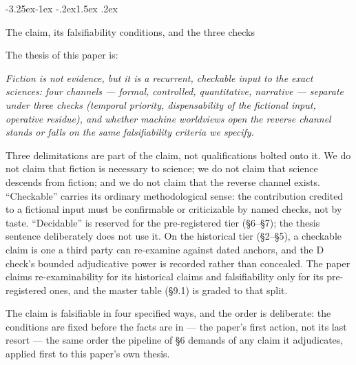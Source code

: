 \documentclass[11pt,a4paper]{article}
\makeatletter
\renewcommand\subsection{\@startsection{subsection}{2}{\z@}%
  {-3.25ex\@plus -1ex \@minus -.2ex}{1.5ex \@plus .2ex}%
  {\normalfont\large\bfseries\raggedright}}
\makeatother
\begin{document}
\subsection{The claim, its falsifiability conditions, and the three checks}

The thesis of this paper is:

\textit{Fiction is not evidence, but it is a recurrent, checkable input to the exact sciences: four channels — formal, controlled, quantitative, narrative — separate under three checks (temporal priority, dispensability of the fictional input, operative residue), and whether machine worldviews open the reverse channel stands or falls on the same falsifiability criteria we specify.}

Three delimitations are part of the claim, not qualifications bolted onto it. We do not claim that fiction is necessary to science; we do not claim that science descends from fiction; and we do not claim that the reverse channel exists. ``Checkable'' carries its ordinary methodological sense: the contribution credited to a fictional input must be confirmable or criticizable by named checks, not by taste. ``Decidable'' is reserved for the pre-registered tier (§6–§7); the thesis sentence deliberately does not use it. On the historical tier (§2–§5), a checkable claim is one a third party can re-examine against dated anchors, and the D check's bounded adjudicative power is recorded rather than concealed. The paper claims re-examinability for its historical claims and falsifiability only for its pre-registered ones, and the master table (§9.1) is graded to that split.

The claim is falsifiable in four specified ways, and the order is deliberate: the conditions are fixed before the facts are in — the paper's first action, not its last resort — the same order the pipeline of §6 demands of any claim it adjudicates, applied first to this paper's own thesis.
\end{document}
